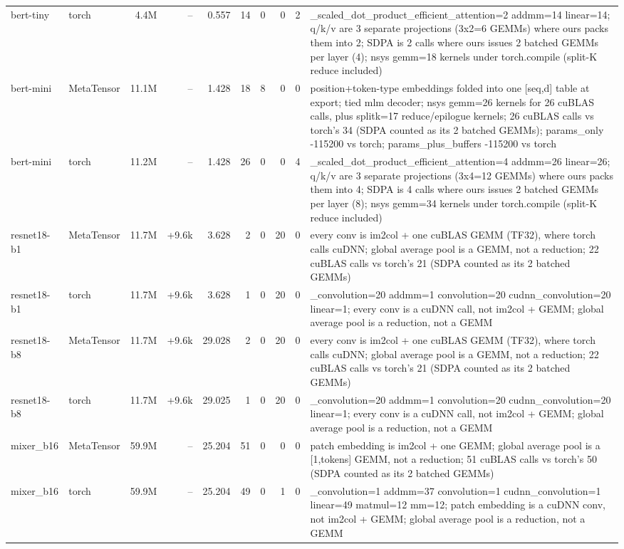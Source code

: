 \begin{tabular}{llrrrrrrrp{}}
bert-tiny & torch & 4.4M & -- & 0.557 & 14 & 0 & 0 & 2 & \_scaled\_dot\_product\_efficient\_attention=2 addmm=14 linear=14; q/k/v are 3 separate projections (3x2=6 GEMMs) where ours packs them into 2; SDPA is 2 calls where ours issues 2 batched GEMMs per layer (4); nsys gemm=18 kernels under torch.compile (split-K reduce included) \\
bert-mini & MetaTensor & 11.1M & -- & 1.428 & 18 & 8 & 0 & 0 & position+token-type embeddings folded into one [seq,d] table at export; tied mlm decoder; nsys gemm=26 kernels for 26 cuBLAS calls, plus splitk=17 reduce/epilogue kernels; 26 cuBLAS calls vs torch's 34 (SDPA counted as its 2 batched GEMMs); params\_only -115200 vs torch; params\_plus\_buffers -115200 vs torch \\
bert-mini & torch & 11.2M & -- & 1.428 & 26 & 0 & 0 & 4 & \_scaled\_dot\_product\_efficient\_attention=4 addmm=26 linear=26; q/k/v are 3 separate projections (3x4=12 GEMMs) where ours packs them into 4; SDPA is 4 calls where ours issues 2 batched GEMMs per layer (8); nsys gemm=34 kernels under torch.compile (split-K reduce included) \\
resnet18-b1 & MetaTensor & 11.7M & +9.6k & 3.628 & 2 & 0 & 20 & 0 & every conv is im2col + one cuBLAS GEMM (TF32), where torch calls cuDNN; global average pool is a GEMM, not a reduction; 22 cuBLAS calls vs torch's 21 (SDPA counted as its 2 batched GEMMs) \\
resnet18-b1 & torch & 11.7M & +9.6k & 3.628 & 1 & 0 & 20 & 0 & \_convolution=20 addmm=1 convolution=20 cudnn\_convolution=20 linear=1; every conv is a cuDNN call, not im2col + GEMM; global average pool is a reduction, not a GEMM \\
resnet18-b8 & MetaTensor & 11.7M & +9.6k & 29.028 & 2 & 0 & 20 & 0 & every conv is im2col + one cuBLAS GEMM (TF32), where torch calls cuDNN; global average pool is a GEMM, not a reduction; 22 cuBLAS calls vs torch's 21 (SDPA counted as its 2 batched GEMMs) \\
resnet18-b8 & torch & 11.7M & +9.6k & 29.025 & 1 & 0 & 20 & 0 & \_convolution=20 addmm=1 convolution=20 cudnn\_convolution=20 linear=1; every conv is a cuDNN call, not im2col + GEMM; global average pool is a reduction, not a GEMM \\
mixer\_b16 & MetaTensor & 59.9M & -- & 25.204 & 51 & 0 & 0 & 0 & patch embedding is im2col + one GEMM; global average pool is a [1,tokens] GEMM, not a reduction; 51 cuBLAS calls vs torch's 50 (SDPA counted as its 2 batched GEMMs) \\
mixer\_b16 & torch & 59.9M & -- & 25.204 & 49 & 0 & 1 & 0 & \_convolution=1 addmm=37 convolution=1 cudnn\_convolution=1 linear=49 matmul=12 mm=12; patch embedding is a cuDNN conv, not im2col + GEMM; global average pool is a reduction, not a GEMM \\

\end{tabular}
